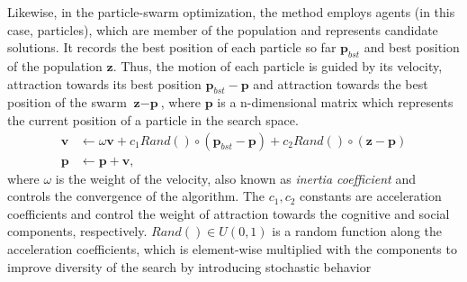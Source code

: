 Likewise, in the particle-swarm optimization, the method employs agents (in this case, particles), which are member of the population and represents candidate solutions. It records the best position of each particle so far $\textbf{p}_{bst}$ and best position of the population $\textbf{z}$. Thus, the motion of each particle is guided by its velocity, attraction towards its best position $\textbf{p}_{bst}-\textbf{p}$ and attraction towards the best position of the swarm $\textbf{z}-\textbf{p}$, where $\textbf{p}$ is a n-dimensional matrix which represents the current position of a particle in the search space.
\begin{align}
\label{eqn_pso_velocity}
\textbf{v} &\leftarrow  \omega\textbf{v} + c_1Rand()\circ(\textbf{p}_{bst}-\textbf{p}) + c_2Rand()\circ(\textbf{z}-\textbf{p})\\
\label{eqn_pso_position}
\textbf{p} &\leftarrow \textbf{p} + \textbf{v},
\end{align}
where $\omega$ is the weight of the velocity, also known as \textit{inertia coefficient} and controls the convergence of the algorithm. The $c_1, c_2$ constants are acceleration coefficients and control the weight of attraction towards the cognitive and social components, respectively. $Rand()\in U(0,1)$ is a random function along the acceleration coefficients, which is element-wise multiplied with the components to improve diversity of the search by introducing stochastic behavior